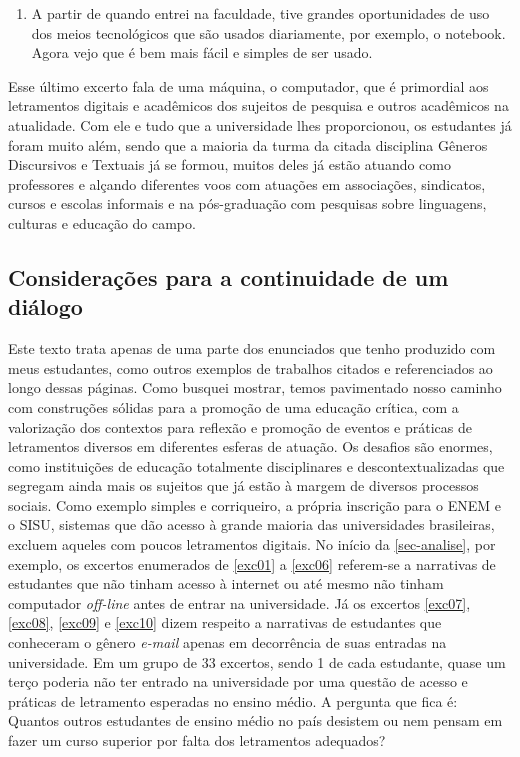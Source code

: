 \documentclass{textolivre}
\begin{document}
\begin{enumerate}[resume,label={(\arabic*)},ref={\arabic*},topsep=1ex,partopsep=1ex]
\item A partir de quando entrei na faculdade, tive grandes oportunidades de uso dos meios tecnológicos que são usados diariamente, por exemplo, o notebook. Agora vejo que é bem mais fácil e simples de ser usado.
\end{enumerate}

Esse último excerto fala de uma máquina, o computador, que é primordial aos letramentos digitais e acadêmicos dos sujeitos de pesquisa e outros acadêmicos na atualidade. Com ele e tudo que a universidade lhes proporcionou, os estudantes já foram muito além, sendo que a maioria da turma da citada disciplina Gêneros Discursivos e Textuais já se formou, muitos deles já estão atuando como professores e alçando diferentes voos com atuações em associações, sindicatos, cursos e escolas informais e na pós-graduação com pesquisas sobre linguagens, culturas e educação do campo.

\subsection{Considerações para a continuidade de um diálogo}\label{sec-consideracoes}
Este texto trata apenas de uma parte dos enunciados que tenho produzido com meus estudantes, como outros exemplos de trabalhos citados e referenciados ao longo dessas páginas. Como busquei mostrar, temos pavimentado nosso caminho com construções sólidas para a promoção de uma educação crítica, com a valorização dos contextos para reflexão e promoção de eventos e práticas de letramentos diversos em diferentes esferas de atuação. Os desafios são enormes, como instituições de educação totalmente disciplinares e descontextualizadas que segregam ainda mais os sujeitos que já estão à margem de diversos processos sociais. Como exemplo simples e corriqueiro, a própria inscrição para o ENEM e o SISU, sistemas que dão acesso à grande maioria das universidades brasileiras, excluem aqueles com poucos letramentos digitais. No início da \cref{sec-analise}, por exemplo, os excertos enumerados de \ref{exc01} a \ref{exc06} referem-se a narrativas de estudantes que não tinham acesso à internet ou até mesmo não tinham computador \textit{off-line} antes de entrar na universidade. Já os excertos \ref{exc07}, \ref{exc08}, \ref{exc09} e \ref{exc10} dizem respeito a narrativas de estudantes que conheceram o gênero \textit{e-mail} apenas em decorrência de suas entradas na universidade. Em um grupo de 33 excertos, sendo 1 de cada estudante, quase um terço poderia não ter entrado na universidade por uma questão de acesso e práticas de letramento esperadas no ensino médio. A pergunta que fica é: Quantos outros estudantes de ensino médio no país desistem ou nem pensam em fazer um curso superior por falta dos letramentos adequados?
\end{document}
